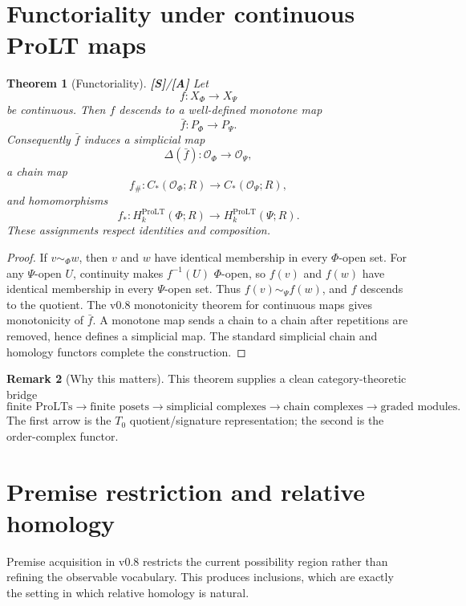 \documentclass[11pt]{article}
\newtheorem{theorem}{Theorem}[section]
\theoremstyle{definition}
\newtheorem{remark}[theorem]{Remark}
\newcommand{\OX}{\mathcal O}
\newcommand{\statusS}{\textbf{[S]}}
\newcommand{\statusA}{\textbf{[A]}}
\begin{document}
\section{Functoriality under continuous ProLT maps}

\begin{theorem}[Functoriality]\label{thm:functor}
\statusS/\statusA\;
Let
\[
f:X_\Phi\longrightarrow X_\Psi
\]
be continuous. Then $f$ descends to a well-defined monotone map
\[
\bar f:P_\Phi\longrightarrow P_\Psi.
\]
Consequently $\bar f$ induces a simplicial map
\[
\Delta(\bar f):\OX_\Phi\longrightarrow\OX_\Psi,
\]
a chain map
\[
f_\#:C_*(\OX_\Phi;R)\longrightarrow C_*(\OX_\Psi;R),
\]
and homomorphisms
\[
f_*:H_k^{\mathrm{ProLT}}(\Phi;R)\longrightarrow H_k^{\mathrm{ProLT}}(\Psi;R).
\]
These assignments respect identities and composition.
\end{theorem}

\begin{proof}
If $v\sim_\Phi w$, then $v$ and $w$ have identical membership in every $\Phi$-open set. For any $\Psi$-open $U$, continuity makes $f^{-1}(U)$ $\Phi$-open, so $f(v)$ and $f(w)$ have identical membership in every $\Psi$-open set. Thus $f(v)\sim_\Psi f(w)$, and $f$ descends to the quotient. The v0.8 monotonicity theorem for continuous maps gives monotonicity of $\bar f$. A monotone map sends a chain to a chain after repetitions are removed, hence defines a simplicial map. The standard simplicial chain and homology functors complete the construction.
\end{proof}

\begin{remark}[Why this matters]
This theorem supplies a clean category-theoretic bridge
\[
\text{finite ProLTs}\longrightarrow\text{finite posets}\longrightarrow
\text{simplicial complexes}\longrightarrow\text{chain complexes}\longrightarrow\text{graded modules}.
\]
The first arrow is the $T_0$ quotient/signature representation; the second is the order-complex functor.
\end{remark}

\section{Premise restriction and relative homology}

Premise acquisition in v0.8 restricts the current possibility region rather than refining the observable vocabulary. This produces inclusions, which are exactly the setting in which relative homology is natural.
\end{document}
